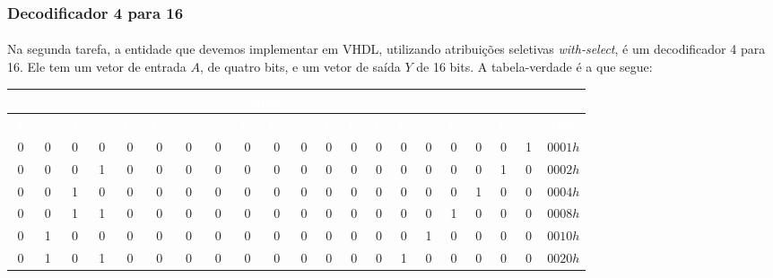 \documentclass[a4paper,12pt]{article}
\begin{document}
\subsubsection{Decodificador 4 para 16}
\paragraph{}
Na segunda tarefa, a entidade que devemos implementar em VHDL, utilizando atribuições seletivas \textit{with-select}, é um decodificador 4 para 16. Ele tem um vetor de entrada $A$, de quatro bits, e um vetor de saída $Y$ de 16 bits. A tabela-verdade é a que segue:

\begin{table}[H]
    \centering
    \footnotesize
    \setlength{\tabcolsep}{3pt}
    \begin{tabular}{|cccc|cccccccccccccccc|c|}
        \hline
        \rowcolor{black}
        \multicolumn{4}{|c|}{\textbf{\textcolor{white}{Entrada}}} & \multicolumn{17}{|c|}{\textbf{\textcolor{white}{Saída}}} \\ \hline
        \rowcolor{black}
        \textcolor{white}{$A_3$} & \textcolor{white}{$A_2$} & \textcolor{white}{$A_1$} & \textcolor{white}{$A_0$} & \textcolor{white}{$Y_{15}$} & \textcolor{white}{$Y_{14}$} & \textcolor{white}{$Y_{13}$} & \textcolor{white}{$Y_{12}$} & \textcolor{white}{$Y_{11}$} & \textcolor{white}{$Y_{10}$} & \textcolor{white}{$Y_9$} & \textcolor{white}{$Y_8$} & \textcolor{white}{$Y_7$} & \textcolor{white}{$Y_6$} & \textcolor{white}{$Y_5$} & \textcolor{white}{$Y_4$} & \textcolor{white}{$Y_3$} & \textcolor{white}{$Y_2$} & \textcolor{white}{$Y_1$} & \textcolor{white}{$Y_0$} & \textbf{\textcolor{white}{Hex}} \\ \hline
        0 & 0 & 0 & 0 & 0 & 0 & 0 & 0 &  0 & 0 & 0 & 0 & 0 & 0 & 0 & 0 &  0 & 0 & 0 & 1 & $0001h$ \\ \hline
        \rowcolor{cinza}
        0 & 0 & 0 & 1 & 0 & 0 & 0 & 0 & 0 & 0 & 0 & 0 & 0 & 0 & 0 & 0 & 0 & 0 & 1 & 0 & $0002h$ \\ \hline
        0 & 0 & 1 & 0 & 0 & 0 & 0 & 0 & 0 & 0 & 0 & 0 & 0 & 0 & 0 & 0 & 0 & 1 & 0 & 0 & $0004h$ \\ \hline
        \rowcolor{cinza}
        0 & 0 & 1 & 1 & 0 & 0 & 0 & 0 & 0 & 0 & 0 & 0 & 0 & 0 & 0 & 0 & 1 & 0 & 0 & 0 & $0008h$ \\ \hline
        0 & 1 & 0 & 0 & 0 & 0 & 0 & 0 & 0 & 0 & 0 & 0 & 0 & 0 & 0 & 1 & 0 & 0 & 0 & 0 & $0010h$ \\ \hline
        \rowcolor{cinza}
        0 & 1 & 0 & 1 & 0 & 0 & 0 & 0 & 0 & 0 & 0 & 0 & 0 & 0 & 1 & 0 & 0 & 0 & 0 & 0 & $0020h$ \\ \hline

\end{tabular}
\end{table}
\end{document}
